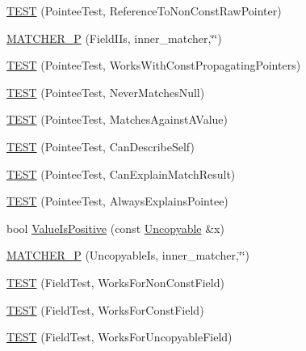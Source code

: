 \begin{DoxyCompactItemize}
\item 
\hyperlink{namespacetesting_1_1gmock__matchers__test_a2d2296f6b23130be225b8df48746dfd5}{T\+E\+ST} (Pointee\+Test, Reference\+To\+Non\+Const\+Raw\+Pointer)
\item 
\hyperlink{namespacetesting_1_1gmock__matchers__test_a43d7cb618a83048cd99b55edbec586bb}{M\+A\+T\+C\+H\+E\+R\+\_\+P} (Field\+I\+Is, inner\+\_\+matcher,\char`\"{}\char`\"{})
\item 
\hyperlink{namespacetesting_1_1gmock__matchers__test_a9d851a5bb597fa45b5d1cf3f295398e8}{T\+E\+ST} (Pointee\+Test, Works\+With\+Const\+Propagating\+Pointers)
\item 
\hyperlink{namespacetesting_1_1gmock__matchers__test_ac778a9cebf9306a5efd27cc1186d8269}{T\+E\+ST} (Pointee\+Test, Never\+Matches\+Null)
\item 
\hyperlink{namespacetesting_1_1gmock__matchers__test_afe22e8230dc7a34498e4b2f91dcdd7cd}{T\+E\+ST} (Pointee\+Test, Matches\+Against\+A\+Value)
\item 
\hyperlink{namespacetesting_1_1gmock__matchers__test_ac8b9baa938635d587f0b0df1073208e2}{T\+E\+ST} (Pointee\+Test, Can\+Describe\+Self)
\item 
\hyperlink{namespacetesting_1_1gmock__matchers__test_a263ede06f6b32a625bb40e4f4c58c8dc}{T\+E\+ST} (Pointee\+Test, Can\+Explain\+Match\+Result)
\item 
\hyperlink{namespacetesting_1_1gmock__matchers__test_a00128de027ff6f49f82a7011dd346d43}{T\+E\+ST} (Pointee\+Test, Always\+Explains\+Pointee)
\item 
bool \hyperlink{namespacetesting_1_1gmock__matchers__test_a7c429b4fa8a7835724d9e28033e908b2}{Value\+Is\+Positive} (const \hyperlink{classtesting_1_1gmock__matchers__test_1_1Uncopyable}{Uncopyable} \&x)
\item 
\hyperlink{namespacetesting_1_1gmock__matchers__test_afcdfddd9d56b20c0692a360115189836}{M\+A\+T\+C\+H\+E\+R\+\_\+P} (Uncopyable\+Is, inner\+\_\+matcher,\char`\"{}\char`\"{})
\item 
\hyperlink{namespacetesting_1_1gmock__matchers__test_a57213a63527bbd66c024dd1cfafe92d1}{T\+E\+ST} (Field\+Test, Works\+For\+Non\+Const\+Field)
\item 
\hyperlink{namespacetesting_1_1gmock__matchers__test_a065efc397a420d3dde87909b4a9a6285}{T\+E\+ST} (Field\+Test, Works\+For\+Const\+Field)
\item 
\hyperlink{namespacetesting_1_1gmock__matchers__test_ac26d681f09865b0727ca32343d974907}{T\+E\+ST} (Field\+Test, Works\+For\+Uncopyable\+Field)
\item 

\end{DoxyCompactItemize}
